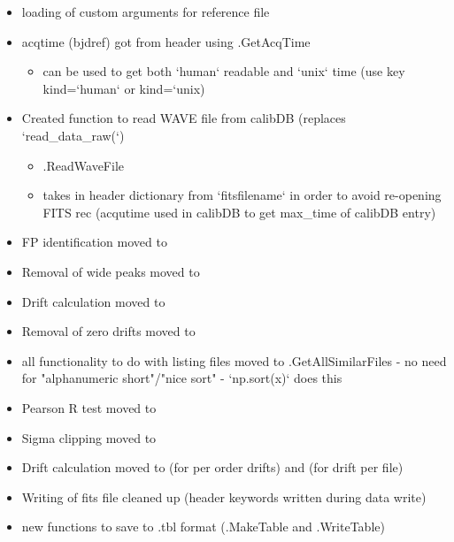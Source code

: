 \begin{itemize}
\item loading of custom arguments for reference file

\item acqtime (bjdref) got from header using \spirouImage.GetAcqTime
	\begin{itemize}
	\item can be used to get both `human` readable and `unix` time (use key kind=`human` or kind=`unix)
	\end{itemize}

\item Created function to read WAVE file from calibDB (replaces `read\_data\_raw(`)
	\begin{itemize}
	\item \spirouImage.ReadWaveFile
	\item takes in header dictionary from `fitsfilename` in order to avoid re-opening FITS rec (acqutime used in calibDB to get max\_time of calibDB entry) 
	\end{itemize}

\item FP identification moved to 

\item Removal of wide peaks moved to 

\item Drift calculation moved to 

\item Removal of zero drifts moved to 

\item all functionality to do with listing files moved to \spirouImage{\hskip 0pt}.GetAllSimilarFiles - no need for "alphanumeric short"/"nice sort" - `np.sort(x)` does this
    
\item Pearson R test moved to 

\item Sigma clipping moved to 

\item Drift calculation moved to  (for per order drifts) and  (for drift per file)

\item Writing of fits file cleaned up (header keywords written during data write)

\item new functions to save to .tbl format (\spirouImage.MakeTable and \spirouImage.WriteTable)

\end{itemize}


